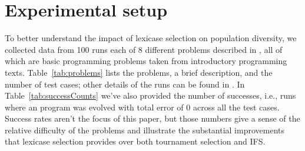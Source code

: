 \section{Experimental setup}
\label{sec:setup}

To better understand the impact of lexicase selection on population diversity, we collected data
from 100 runs each of 8 different problems described in \cite{Helmuth:2015:GECCO}, all of which are
basic programming problems taken from introductory programming texts. Table~\ref{tab:problems} lists
the problems, a brief description, and the number of test cases; other details of the runs can be
found in \cite{Helmuth:2015:GECCO}. In Table~\ref{tab:successCounts} we've also provided the number 
of successes, i.e., runs where an program was evolved with total error of 0 across all the test cases.
Success rates aren't the focus of this paper, but those numbers give a sense of the relative
difficulty of the problems and illustrate the substantial improvements that lexicase selection
provides over both tournament selection and IFS.

